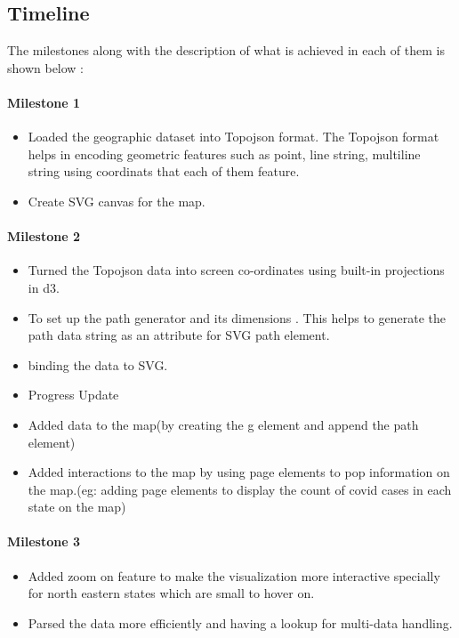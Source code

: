 \subsection{Timeline}
\label{sec:timeline}

The milestones along with the description of what is achieved in each of them is shown below :

\paragraph{Milestone 1}
\begin{itemize}
\item Loaded the geographic dataset into Topojson format. The Topojson format helps in encoding geometric features such as point, line string, multiline string using coordinats that each of them feature.
\item Create SVG canvas for the map.
\end{itemize}

\paragraph{Milestone 2}

\begin{itemize}
\item Turned the Topojson data into screen co-ordinates using built-in projections in d3\cite{proj}.
\item To set up the path generator and its dimensions \cite{geoPath}.  This helps to generate the path data string as an attribute for SVG path element.
 \item binding the data to SVG.
\item Progress Update
\item Added data to the map(by creating the g element and append the path element)
\item Added interactions to the map by using page elements to pop information on the map.(eg: adding page elements to display the count of covid cases in each state on the map)
\end{itemize}

\paragraph{Milestone 3}
\begin{itemize}
\item Added zoom on feature to make the visualization more interactive specially for north eastern states which are small to hover on.
\item Parsed the data more efficiently and having a lookup for multi-data handling.
\end{itemize}

